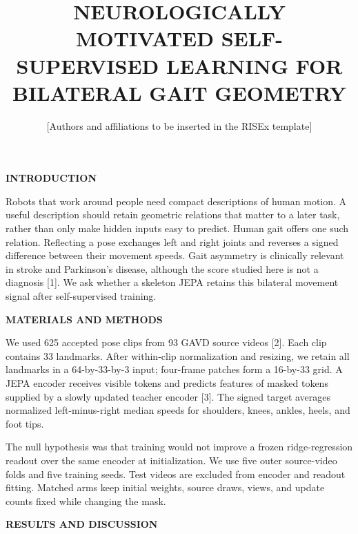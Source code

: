 \documentclass[11pt,letterpaper]{article}
\title{\vspace{-1.2em}\textbf{\MakeUppercase{Neurologically Motivated
Self-Supervised Learning for Bilateral Gait Geometry}}\vspace{-0.5em}}
\author{\normalsize [Authors and affiliations to be inserted in the RISEx template]}
\date{}
\renewcommand{\subsection}[1]{\vspace{2pt}\noindent\textbf{#1}\par\vspace{1pt}}
\begin{document}
\twocolumn[
  \begin{@twocolumnfalse}
  \maketitle
  \vspace{-1.1em}
  \end{@twocolumnfalse}
]
\subsection{INTRODUCTION}\label{introduction}

Robots that work around people need compact descriptions of human
motion. A useful description should retain geometric relations that
matter to a later task, rather than only make hidden inputs easy to
predict. Human gait offers one such relation. Reflecting a pose
exchanges left and right joints and reverses a signed difference between
their movement speeds. Gait asymmetry is clinically relevant in stroke
and Parkinson's disease, although the score studied here is not a
diagnosis {[}1{]}. We ask whether a skeleton JEPA retains this bilateral
movement signal after self-supervised training.

\subsection{MATERIALS AND METHODS}\label{materials-and-methods}

We used 625 accepted pose clips from 93 GAVD source videos {[}2{]}. Each
clip contains 33 landmarks. After within-clip normalization and
resizing, we retain all landmarks in a 64-by-33-by-3 input; four-frame
patches form a 16-by-33 grid. A JEPA encoder receives visible tokens and
predicts features of masked tokens supplied by a slowly updated teacher
encoder {[}3{]}. The signed target averages normalized left-minus-right
median speeds for shoulders, knees, ankles, heels, and foot tips.

The null hypothesis was that training would not improve a frozen
ridge-regression readout over the same encoder at initialization. We use
five outer source-video folds and five training seeds. Test videos are
excluded from encoder and readout fitting. Matched arms keep initial
weights, source draws, views, and update counts fixed while changing the
mask.

\subsection{RESULTS AND DISCUSSION}\label{results-and-discussion}
\end{document}
